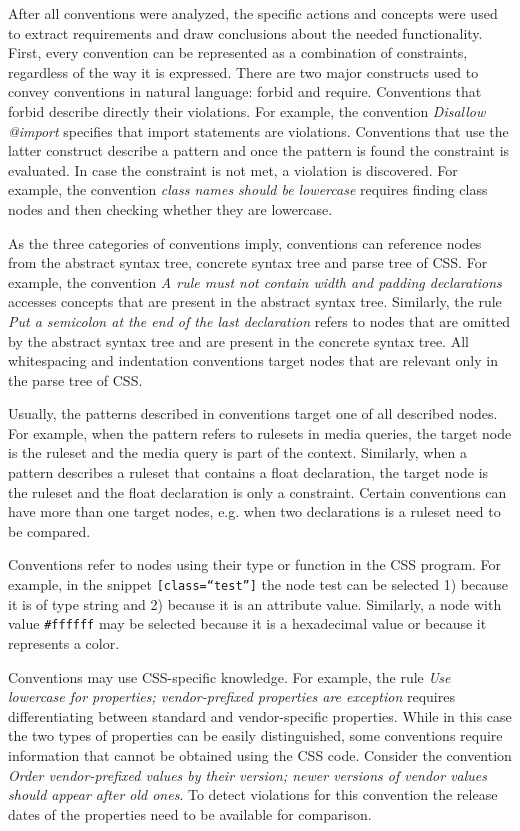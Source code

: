 After all conventions were analyzed, the specific actions and concepts were
used to extract requirements and draw conclusions about the needed
functionality. First, every convention can be represented as a combination of
constraints, regardless of the way it is expressed. There are two major
constructs used to convey conventions in natural language: forbid and require.
Conventions that forbid describe directly their violations. For example, the
convention \textit{Disallow @import} specifies that import statements are
violations. Conventions that use the latter construct describe a pattern and
once the pattern is found the constraint is evaluated. In case the constraint
is not met, a violation is discovered. For example, the convention
\textit{class names should be lowercase} requires finding class nodes and then
checking whether they are lowercase.

As the three categories of conventions imply, conventions can reference nodes
from the abstract syntax tree, concrete syntax tree and parse tree of CSS. For
example, the convention \textit{A rule must not contain width and padding
declarations} accesses concepts that are present in the abstract syntax tree.
Similarly, the rule \textit{Put a semicolon at the end of the last
declaration} refers to nodes that are omitted by the abstract syntax tree and
are present in the concrete syntax tree. All whitespacing and indentation
conventions target nodes that are relevant only in the parse tree of CSS.

Usually, the patterns described in conventions target one of all described
nodes. For example, when the pattern refers to rulesets in media queries, the
target node is the ruleset and the media query is part of the context.
Similarly, when a pattern describes a ruleset that contains a float
declaration, the target node is the ruleset and the float declaration is only
a constraint. Certain conventions can have more than one target nodes, e.g.
when two declarations is a ruleset need to be compared.

Conventions refer to nodes using their type or function in the CSS program.
For example, in the snippet \texttt{[class=``test'']} the node test can be
selected 1) because it is of type string and 2) because it is an attribute
value. Similarly, a node with value \texttt{\#ffffff} may be selected because
it is a hexadecimal value or because it represents a color.

Conventions may use CSS-specific knowledge. For example, the rule \textit{Use
lowercase for properties; vendor-prefixed properties are exception} requires
differentiating between standard and vendor-specific properties. While in this
case the two types of properties can be easily distinguished, some conventions
require information that cannot be obtained using the CSS code. Consider the
convention \textit{Order vendor-prefixed values by their version; newer
versions of vendor values should appear after old ones}. To detect violations
for this convention the release dates of the properties need to be available
for comparison.

